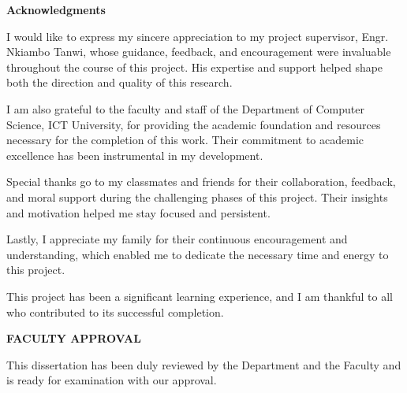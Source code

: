 \documentclass[
  12pt,
  oneside]{article}
\begin{document}
\vfill %
\clearpage

\thispagestyle{empty}
\begin{center}
\textbf{\large Acknowledgments}
\end{center}

\vspace{2cm} %

I would like to express my sincere appreciation to my project supervisor, Engr. Nkiambo Tanwi, whose guidance, feedback, and encouragement were invaluable throughout the course of this project. His expertise and support helped shape both the direction and quality of this research.

I am also grateful to the faculty and staff of the Department of Computer Science, ICT University, for providing the academic foundation and resources necessary for the completion of this work. Their commitment to academic excellence has been instrumental in my development.

Special thanks go to my classmates and friends for their collaboration, feedback, and moral support during the challenging phases of this project. Their insights and motivation helped me stay focused and persistent.

Lastly, I appreciate my family for their continuous encouragement and understanding, which enabled me to dedicate the necessary time and energy to this project.

This project has been a significant learning experience, and I am thankful to all who contributed to its successful completion.

\vfill %
\clearpage

\thispagestyle{empty}
\begin{center}
\textbf{\large FACULTY APPROVAL}
\end{center}

\vspace{1cm}

This dissertation has been duly reviewed by the Department and the Faculty and is ready for examination with our approval.

\vspace{2cm}
\end{document}
